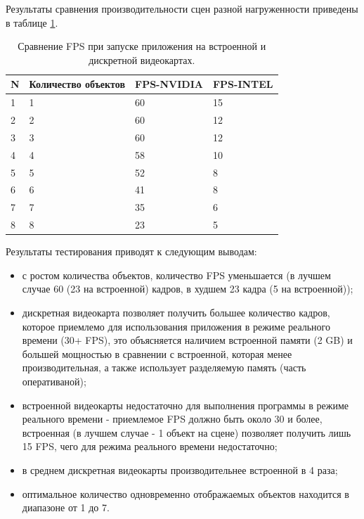Результаты сравнения производительности сцен разной нагруженности приведены в таблице \ref{tb:comp_fps}.
\begin{table}[]
  \caption{Сравнение FPS при запуске приложения на встроенной и дискретной видеокартах.}
  \begin{tabular}{|l|l|l|l|}
  \hline
  N & Количество объектов & FPS-NVIDIA & FPS-INTEL \\
  \hline
  1 & 1                   & 60         & 15        \\
  2 & 2                   & 60         & 12        \\
  3 & 3                   & 60         & 12        \\
  4 & 4                   & 58         & 10        \\
  5 & 5                   & 52         & 8         \\
  6 & 6                   & 41         & 8         \\
  7 & 7                   & 35         & 6         \\
  8 & 8                   & 23         & 5        \\
  \hline
  \end{tabular}
  \label{tb:comp_fps}
\end{table}

Результаты тестирования приводят к следующим выводам:
\begin{itemize}
  \item с ростом количества объектов, количество FPS уменьшается (в лучшем случае 60 (23 на встроенной) кадров, в худшем 23 кадра (5 на встроенной));
  \item дискретная видеокарта позволяет получить большее количество кадров, которое приемлемо для использования приложения в режиме реального времени (30+ FPS),
  это объясняется наличием встроенной памяти (2 GB) и большей мощностью в сравнении с встроенной, которая менее производительная, а также использует разделяемую память (часть оперативаной);
  \item встроенной видеокарты недостаточно для выполнения программы в режиме реального времени - приемлемое FPS должно быть около 30 и более, встроенная 
  (в лучшем случае - 1 объект на сцене) позволяет получить лишь 15 FPS, чего для режима реального времени недостаточно;
  \item в среднем дискретная видеокарты производительнее встроенной в 4 раза;
  \item оптимальное количество одновременно отображаемых объектов находится в диапазоне от 1 до 7.
\end{itemize}


